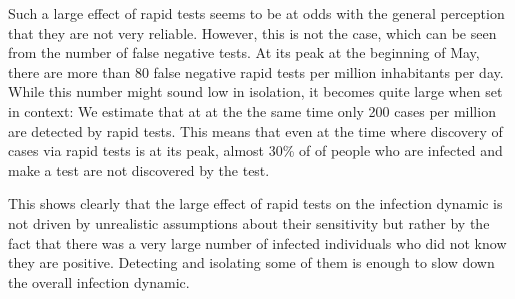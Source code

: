 Such a large effect of rapid tests seems to be at odds with the general perception that
they are not very reliable. However, this is not the case, which can be seen from the
number of
false negative tests. At its peak at the beginning of May, there are more than 80 false
negative rapid tests per million inhabitants per day. While this number might sound low
in isolation, it becomes quite large when set in context: We estimate that at at the
the same time only 200 cases per million are detected by rapid tests. This means that
even at the time where discovery of cases via rapid tests is at its peak, almost
30\% of of people who are infected and make a test are not discovered by the test.

This shows clearly that the large effect of rapid tests on the infection dynamic
is not driven by unrealistic assumptions about their sensitivity but rather by the
fact that there was a very large number of infected individuals who did not know they
are positive. Detecting and isolating some of them is enough to slow down the
overall infection dynamic.

